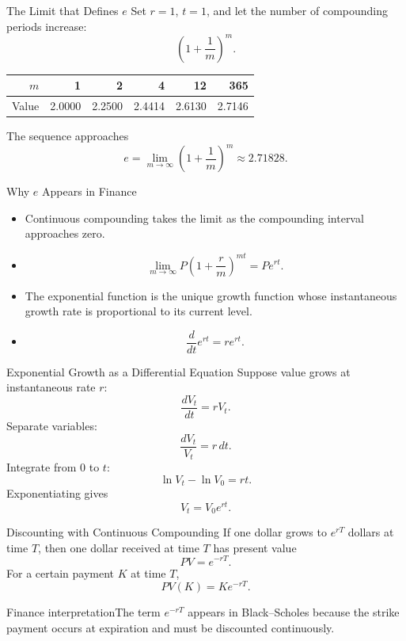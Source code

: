 \documentclass[aspectratio=169]{beamer}
\begin{document}
\begin{frame}[t]{The Limit that Defines $e$}
\justifying
Set $r=1$, $t=1$, and let the number of compounding periods increase:
\[\left(1+\frac{1}{m}\right)^m.\]
\begin{center}
\begin{tabular}{rrrrrr}\toprule
$m$&1&2&4&12&365\\\midrule
Value&2.0000&2.2500&2.4414&2.6130&2.7146\\\bottomrule
\end{tabular}
\end{center}
The sequence approaches
\[e=\lim_{m\to\infty}\left(1+\frac{1}{m}\right)^m\approx2.71828.\]
\end{frame}

\begin{frame}[t]{Why $e$ Appears in Finance}
\justifying
\begin{itemize}
\item Continuous compounding takes the limit as the compounding interval approaches zero.
\item \[\lim_{m\to\infty}P\left(1+\frac{r}{m}\right)^{mt}=Pe^{rt}.\]
\item The exponential function is the unique growth function whose instantaneous growth rate is proportional to its current level.
\item \[\frac{d}{dt}e^{rt}=re^{rt}.\]
\end{itemize}
\end{frame}

\begin{frame}[t]{Exponential Growth as a Differential Equation}
\justifying
Suppose value grows at instantaneous rate $r$:
\[\frac{dV_t}{dt}=rV_t.\]
Separate variables:
\[\frac{dV_t}{V_t}=r\,dt.\]
Integrate from $0$ to $t$:
\[\ln V_t-\ln V_0=rt.\]
Exponentiating gives
\[V_t=V_0e^{rt}.\]
\end{frame}

\begin{frame}[t]{Discounting with Continuous Compounding}
\justifying
If one dollar grows to $e^{rT}$ dollars at time $T$, then one dollar received at time $T$ has present value
\[PV=e^{-rT}.\]
For a certain payment $K$ at time $T$,
\[PV(K)=Ke^{-rT}.\]
\begin{block}{Finance interpretation}The term $e^{-rT}$ appears in Black--Scholes because the strike payment occurs at expiration and must be discounted continuously.\end{block}
\end{frame}
\end{document}
